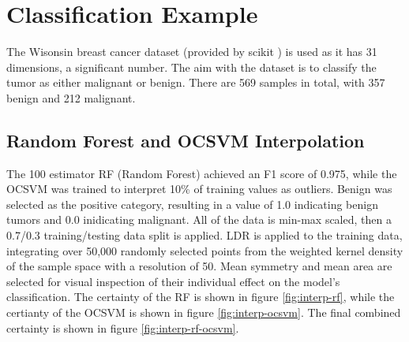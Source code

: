 \documentclass[a4paper, twocolumn]{article}
\begin{document}
\section{Classification Example}

The Wisonsin breast cancer dataset \cite{breastcancer} (provided by scikit \cite{pedregosa2011scikit}) is used as it has 31 dimensions, a significant number. The aim with the dataset is to classify the tumor as either malignant or benign. There are 569 samples in total, with 357 benign and 212 malignant.

\subsection{Random Forest and OCSVM Interpolation}

The 100 estimator RF (Random Forest) \cite{liaw2002classification} achieved an F1 score of 0.975, while the OCSVM was trained to interpret 10\% of training values as outliers. Benign was selected as the positive category, resulting in a value of 1.0 indicating benign tumors and 0.0 inidicating malignant. All of the data is min-max scaled, then a 0.7/0.3 training/testing data split is applied. LDR is applied to the training data, integrating over 50,000 randomly selected points from the weighted kernel density of the sample space with a resolution of 50. Mean symmetry and mean area are selected for visual inspection of their individual effect on the model's classification. The certainty of the RF is shown in figure \ref{fig:interp-rf}, while the certianty of the OCSVM is shown in figure \ref{fig:interp-ocsvm}. The final combined certainty is shown in figure \ref{fig:interp-rf-ocsvm}.
\end{document}

